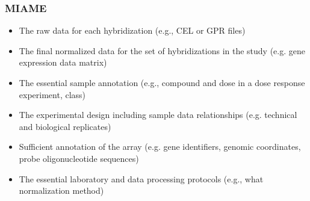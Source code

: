 \documentclass{beamer}
\begin{document}
\begin{frame}
  \frametitle{MIAME}
  

  \begin{itemize}
  \item The raw data for each hybridization (e.g., CEL or GPR files)
  \item The final normalized data for the set of hybridizations in the study (e.g. gene expression data matrix)
  \item The essential sample annotation (e.g., compound and dose in a dose response experiment, class)
  \item The experimental design including sample data relationships (e.g. technical and biological replicates)
  \item Sufficient annotation of the array (e.g. gene identifiers, genomic coordinates, probe oligonucleotide sequences)
  \item The essential laboratory and data processing protocols (e.g., what normalization method)
  \end{itemize}
  
\end{frame}

\end{document}
